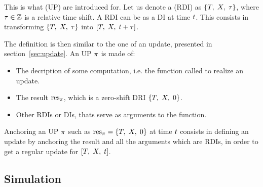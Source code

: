 This is what  (UP) are introduced for. Let us denote a  (RDI) as $\left\{ T,\;X,\;\tau \right\}$, where ${\tau} \in {\mathbb{Z}}$ is a relative time shift. A RDI can be  as a DI at time $t$. This consists in transforming $\left\{ T,\;X,\;\tau \right\}$ into $\left[ T,\;X,\;{t} + {\tau} \right]$.


The definition is then similar to the one of an update, presented in section~\ref{sec:update}.
An UP $\pi$ is made of:
\begin{itemize}
\item The decription of some computation, i.e. the function called to realize an update.
\item The result ${\mathrm{res}}_{\pi}$, which is a zero-shift DRI $\left\{ T,\;X,\;0 \right\}$.
\item Other RDIs or DIs, thats serve as arguments to the function.
\end{itemize}

Anchoring an UP $\pi$ such as ${{\mathrm{res}}_{\pi}} = {\left\{ T,\;X,\;0 \right\}}$ at time $t$ consists in defining an update by anchoring the result and all the arguments which are RDIs, in order to get a regular update for $\left[ T,\;X,\;t \right]$.


\subsection{Simulation}

